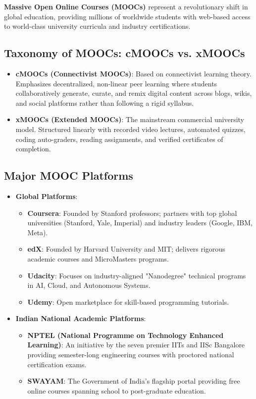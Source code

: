 \textbf{Massive Open Online Courses (MOOCs)} represent a revolutionary shift in global education, providing millions of worldwide students with web-based access to world-class university curricula and industry certifications.

\subsection{Taxonomy of MOOCs: cMOOCs vs. xMOOCs}
\begin{itemize}[leftmargin=1.5em]
    \item \textbf{cMOOCs (Connectivist MOOCs)}: Based on connectivist learning theory. Emphasizes decentralized, non-linear peer learning where students collaboratively generate, curate, and remix digital content across blogs, wikis, and social platforms rather than following a rigid syllabus.
    \item \textbf{xMOOCs (Extended MOOCs)}: The mainstream commercial university model. Structured linearly with recorded video lectures, automated quizzes, coding auto-graders, reading assignments, and verified certificates of completion.
\end{itemize}

\subsection{Major MOOC Platforms}
\begin{itemize}[leftmargin=1.5em]
    \item \textbf{Global Platforms}:
    \begin{itemize}
        \item \textbf{Coursera}: Founded by Stanford professors; partners with top global universities (Stanford, Yale, Imperial) and industry leaders (Google, IBM, Meta).
        \item \textbf{edX}: Founded by Harvard University and MIT; delivers rigorous academic courses and MicroMasters programs.
        \item \textbf{Udacity}: Focuses on industry-aligned "Nanodegree" technical programs in AI, Cloud, and Autonomous Systems.
        \item \textbf{Udemy}: Open marketplace for skill-based programming tutorials.
    \end{itemize}
    \item \textbf{Indian National Academic Platforms}:
    \begin{itemize}
        \item \textbf{NPTEL (National Programme on Technology Enhanced Learning)}: An initiative by the seven premier IITs and IISc Bangalore providing semester-long engineering courses with proctored national certification exams.
        \item \textbf{SWAYAM}: The Government of India's flagship portal providing free online courses spanning school to post-graduate education.
    \end{itemize}
\end{itemize}

